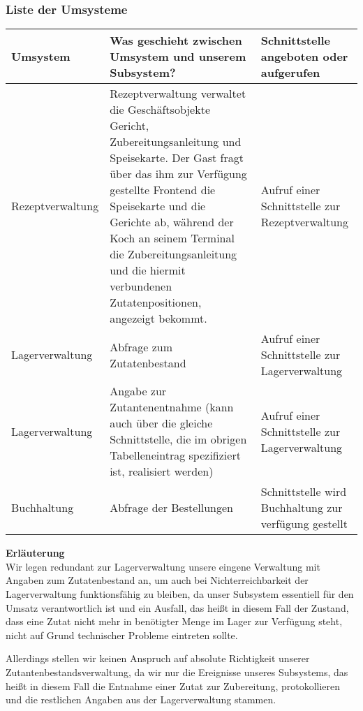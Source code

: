 \subsubsection{Liste der Umsysteme}

\begin{tabu} to \linewidth {X|X|X}
\hline
{}
Umsystem &Was geschieht zwischen Umsystem und unserem Subsystem?
  &Schnittstelle angeboten oder aufgerufen \\
\hline
Rezeptverwaltung &Rezeptverwaltung verwaltet die Gesch\"aftsobjekte Gericht,
  Zubereitungsanleitung und Speisekarte. Der Gast fragt \"uber das ihm zur
  Verf\"ugung gestellte Frontend die Speisekarte und die Gerichte ab, w\"ahrend
  der Koch an seinem Terminal die Zubereitungsanleitung und die hiermit verbundenen
  Zutatenpositionen, angezeigt bekommt.

  &Aufruf einer Schnittstelle zur Rezeptverwaltung \\
\hline
Lagerverwaltung &Abfrage zum Zutatenbestand &Aufruf einer Schnittstelle zur
  Lagerverwaltung \\
\hline
Lagerverwaltung &Angabe zur Zutantenentnahme (kann auch \"uber die gleiche
  Schnittstelle, die im obrigen Tabelleneintrag spezifiziert ist, realisiert
  werden)

  &Aufruf einer Schnittstelle zur Lagerverwaltung \\
\hline
Buchhaltung &Abfrage der Bestellungen &Schnittstelle wird Buchhaltung zur verf\"ugung
  gestellt \\
\hline
\end{tabu}

\textbf{Erl\"auterung} \\

Wir legen redundant zur Lagerverwaltung unsere eingene Verwaltung
mit Angaben zum Zutatenbestand an, um auch bei Nichterreichbarkeit
der Lagerverwaltung funktionsf\"ahig zu bleiben, da unser Subsystem
essentiell f\"ur den Umsatz verantwortlich ist und ein Ausfall, das
hei{\ss}t in diesem Fall der Zustand, dass eine Zutat nicht mehr in
ben\"otigter Menge im Lager zur Verf\"ugung steht, nicht auf Grund
technischer Probleme eintreten sollte.

Allerdings stellen wir keinen Anspruch auf absolute Richtigkeit unserer
Zutantenbestandsverwaltung, da wir nur die Ereignisse unseres Subsystems,
das hei{\ss}t in diesem Fall die Entnahme einer Zutat zur Zubereitung,
protokollieren und die restlichen Angaben aus der Lagerverwaltung stammen.

